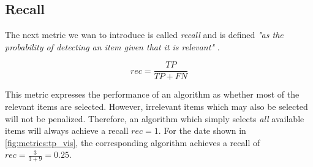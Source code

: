 \subsection{Recall}
\label{chp:fundamentals:sec:metrics:subsec:Recall}

The next metric we wan to introduce is called \textit{recall} and is defined \textit{"as the probability of detecting an item given that it is relevant"} \parencite{Zhu:2004}.

\begin{equation}\label{eq:recall}
    rec = \frac{TP}{TP+FN}
\end{equation}

This metric expresses the performance of an algorithm as whether most of the relevant items are selected.
However, irrelevant items which may also be selected will not be penalized.
Therefore, an algorithm which simply selects \textit{all} available items will always achieve a recall $rec=1$.
For the date shown in \cref{fig:metrics:tp_vis}, the corresponding algorithm achieves a recall of $rec = \frac{3}{3+9} = 0.25$.
